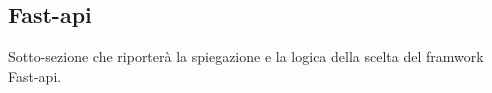 \subsection{Fast-api}

Sotto-sezione che riporterà la spiegazione e la logica della scelta del framwork Fast-api.
